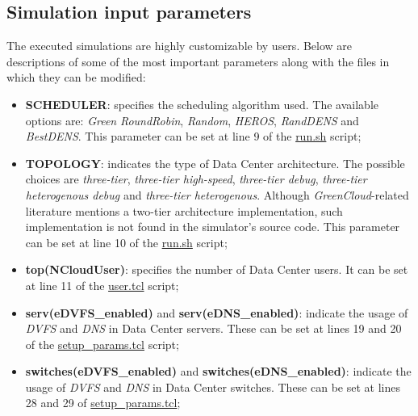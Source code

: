 \subsection{Simulation input parameters}
The executed simulations are highly customizable by users. Below are descriptions of some of the most important parameters along with the files in which they can be modified:
\begin{itemize}
    \item \textbf{SCHEDULER}: specifies the scheduling algorithm used. The available options are: \emph{Green} \emph{RoundRobin}, \emph{Random}, \emph{HEROS}, \emph{RandDENS} and \emph{BestDENS}. This parameter can be set at line 9 of the \href{https://github.com/vincenzo-emanuele/masters-degree-thesis/tree/main/greencloud\_modified\_src/run.sh}{run.sh} script;
    \item \textbf{TOPOLOGY}: indicates the type of Data Center architecture. The possible choices are \emph{three-tier}, \emph{three-tier high-speed}, \emph{three-tier debug}, \emph{three-tier heterogenous debug} and \emph{three-tier heterogenous}. Although \emph{GreenCloud}-related literature mentions a two-tier architecture implementation, such implementation is not found in the simulator's source code. This parameter can be set at line 10 of the \href{https://github.com/vincenzo-emanuele/masters-degree-thesis/tree/main/greencloud\_modified\_src/run.sh}{run.sh} script;
    \item \textbf{top(NCloudUser)}: specifies the number of Data Center users. It can be set at line 11 of the \href{https://github.com/vincenzo-emanuele/masters-degree-thesis/blob/main/greencloud_modified_src/scripts/user.tcl}{user.tcl} script;
    \item \textbf{serv(eDVFS\_enabled)} and \textbf{serv(eDNS\_enabled)}: indicate the usage of \emph{DVFS} and \emph{DNS} in Data Center servers. These can be set at lines 19 and 20 of the \href{https://github.com/vincenzo-emanuele/masters-degree-thesis/blob/main/greencloud\_modified\_src/scripts/setup\_params.tcl}{setup\_params.tcl} script;
    \item \textbf{switches(eDVFS\_enabled)} and \textbf{switches(eDNS\_enabled)}: indicate the usage of \emph{DVFS} and \emph{DNS} in Data Center switches. These can be set at lines 28 and 29 of \href{https://github.com/vincenzo-emanuele/masters-degree-thesis/blob/main/greencloud\_modified\_src/scripts/setup\_params.tcl}{setup\_params.tcl};

\end{itemize}

